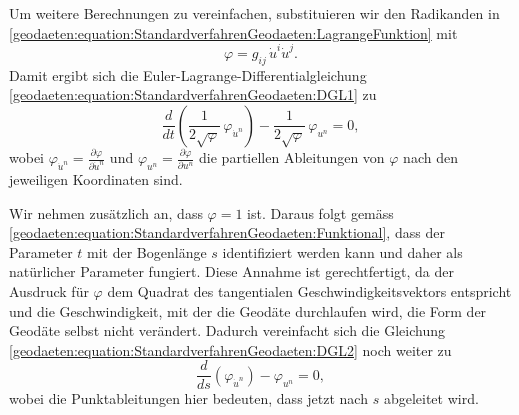 Um weitere Berechnungen zu vereinfachen, substituieren wir den Radikanden in \eqref{geodaeten:equation:StandardverfahrenGeodaeten:LagrangeFunktion} mit
\begin{equation}
	\varphi = g_{i\!j} \, \dot{u}^i \dot{u}^j.
	\label{geodaeten:equation:StandardverfahrenGeodaeten:Substitution}
\end{equation}
Damit ergibt sich die Euler-Lagrange-Differentialgleichung \eqref{geodaeten:equation:StandardverfahrenGeodaeten:DGL1} zu
\begin{equation}
	\frac{d}{dt} \left(\frac{1}{2 \sqrt{\varphi}} \, \varphi_{\dot{u}^n}\right) - \frac{1}{2 \sqrt{\varphi}} \, \varphi_{u^n} = 0,
	\label{geodaeten:equation:StandardverfahrenGeodaeten:DGL2}
\end{equation}
wobei $\varphi_{\dot{u}^n} = \frac{\partial \varphi}{\partial \dot{u}^n}$ und $\varphi_{u^n} = \frac{\partial \varphi}{\partial u^n}$ die partiellen Ableitungen von $\varphi$ nach den jeweiligen Koordinaten sind.

Wir nehmen zusätzlich an, dass $\varphi = 1$ ist.
Daraus folgt gemäss \eqref{geodaeten:equation:StandardverfahrenGeodaeten:Funktional}, dass der Parameter $t$ mit der Bogenlänge $s$ identifiziert werden kann und daher als natürlicher Parameter fungiert. 
Diese Annahme ist gerechtfertigt, da der Ausdruck für $\varphi$ dem Quadrat des tangentialen Geschwindigkeitsvektors entspricht und die Geschwindigkeit, mit der die Geodäte durchlaufen wird, die Form der Geodäte selbst nicht verändert.
Dadurch vereinfacht sich die Gleichung \eqref{geodaeten:equation:StandardverfahrenGeodaeten:DGL2} noch weiter zu
\begin{equation}
	\frac{d}{ds} \left( \varphi_{\dot{u}^n} \right) - \varphi_{u^n} = 0,
	\label{geodaeten:equation:StandardverfahrenGeodaeten:DGL3}
\end{equation}
wobei die Punktableitungen hier bedeuten, dass jetzt nach $s$ abgeleitet wird.

